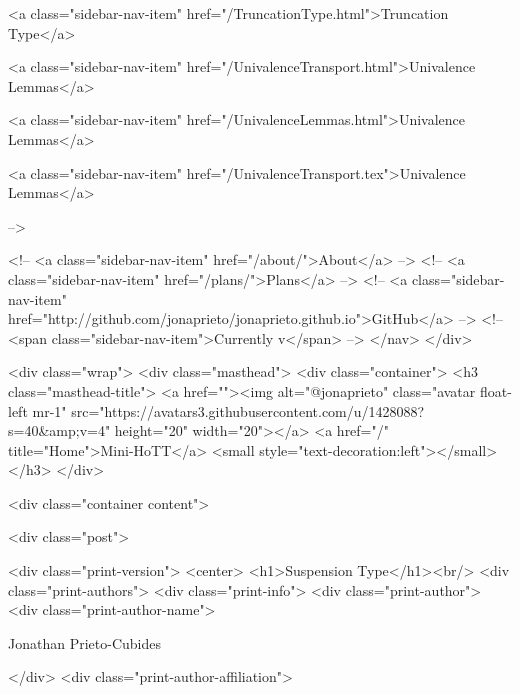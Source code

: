       
    
      
        
          <a class="sidebar-nav-item" href="/TruncationType.html">Truncation Type</a>
        
      
    
      
        
          <a class="sidebar-nav-item" href="/UnivalenceTransport.html">Univalence Lemmas</a>
        
      
    
      
        
          <a class="sidebar-nav-item" href="/UnivalenceLemmas.html">Univalence Lemmas</a>
        
      
    
      
        
          <a class="sidebar-nav-item" href="/UnivalenceTransport.tex">Univalence Lemmas</a>
        
      
     -->

    <!-- <a class="sidebar-nav-item" href="/about/">About</a> -->
    <!-- <a class="sidebar-nav-item" href="/plans/">Plans</a> -->
    <!-- <a class="sidebar-nav-item" href="http://github.com/jonaprieto/jonaprieto.github.io">GitHub</a> -->
    <!-- <span class="sidebar-nav-item">Currently v</span> -->
  </nav>
</div>

    <div class="wrap">
      <div class="masthead">
        <div class="container">
          <h3 class="masthead-title">
            <a href=""><img alt="@jonaprieto" class="avatar float-left mr-1" src="https://avatars3.githubusercontent.com/u/1428088?s=40&amp;v=4" height="20" width="20"></a>
            <a href="/" title="Home">Mini-HoTT</a>
            <small style="text-decoration:left"></small>
          </h3>
        </div>
      
      <div class="container content">
        







<div class="post">

  <div class="print-version">
    <center>
      <h1>Suspension Type</h1><br/>
        <div class="print-authors">
          <div class="print-info">
            <div class="print-author">
              <div class="print-author-name">
                
                  Jonathan Prieto-Cubides
                
              </div>
              <div class="print-author-affiliation">
                
